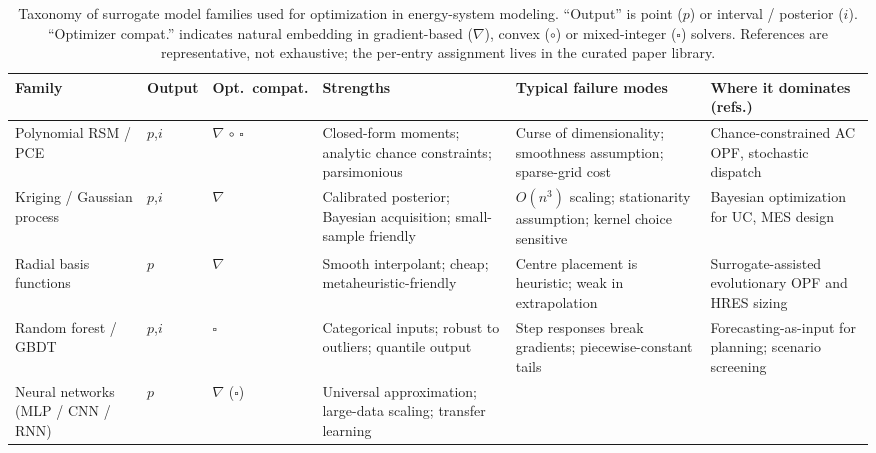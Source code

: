 \begin{table}[!t]
  \centering
  \footnotesize
  \caption{Taxonomy of surrogate model families used for optimization in
  energy-system modeling. ``Output'' is point ($p$) or interval / posterior
  ($i$). ``Optimizer compat.'' indicates natural embedding in
  gradient-based ($\nabla$), convex ($\circ$) or mixed-integer
  ($\square$) solvers. References are representative, not exhaustive;
  the per-entry assignment lives in the curated paper library.}
  \label{tab:T1-taxonomy}
  \renewcommand{\arraystretch}{1.2}
  \begin{tabularx}{\textwidth}{@{}L{0.16\textwidth} C{0.05\textwidth} C{0.08\textwidth} L{0.21\textwidth} L{0.20\textwidth} L{0.22\textwidth}@{}}
    \toprule
    Family & Output & Opt.\ compat. & Strengths & Typical failure modes & Where it dominates (refs.) \\
    \midrule
    Polynomial RSM / PCE
      & $p$,$i$ & $\nabla$ $\circ$ $\square$
      & Closed-form moments; analytic chance constraints; parsimonious
      & Curse of dimensionality; smoothness assumption; sparse-grid cost
      & Chance-constrained AC OPF, stochastic dispatch
        \cite{Muhlpfordt20194806,Muhlpfordt20174490,Koirala20242284,Xu20212696,Engelmann20186188} \\
    Kriging / Gaussian process
      & $p$,$i$ & $\nabla$
      & Calibrated posterior; Bayesian acquisition; small-sample friendly
      & $O(n^3)$ scaling; stationarity assumption; kernel choice sensitive
      & Bayesian optimization for UC, MES design
        \cite{Hu2020,Hu2021671,Volodina2022,Schulte2020,Roth2019214,Liu20222679} \\
    Radial basis functions
      & $p$    & $\nabla$
      & Smooth interpolant; cheap; metaheuristic-friendly
      & Centre placement is heuristic; weak in extrapolation
      & Surrogate-assisted evolutionary OPF and HRES sizing
        \cite{Liu20223726,Mahapatra2022721,Mahapatra20161921,Hussien20211883} \\
    Random forest / GBDT
      & $p$,$i$ & $\square$
      & Categorical inputs; robust to outliers; quantile output
      & Step responses break gradients; piecewise-constant tails
      & Forecasting-as-input for planning; scenario screening
        \cite{Eseye201991463,Faraji2020157284,Hanifi2024,Madhukumar20228891} \\
    Neural networks (MLP / CNN / RNN)
      & $p$ & $\nabla$ ($\square$)
      & Universal approximation; large-data scaling; transfer learning

\end{tabularx}
\end{table}
